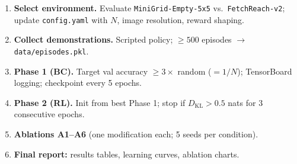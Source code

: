 \documentclass[11pt, a4paper]{article}
\begin{document}
\begin{enumerate}[leftmargin=1.5em, itemsep=0pt, topsep=1pt]
  \item \textbf{Select environment.}
        Evaluate \texttt{MiniGrid-Empty-5x5} vs.\ \texttt{FetchReach-v2};
        update \texttt{config.yaml} with $N$, image resolution, reward shaping.

  \item \textbf{Collect demonstrations.}
        Scripted policy; ${\geq}500$ episodes $\to$ \texttt{data/episodes.pkl}.

  \item \textbf{Phase 1 (BC).}
        Target val accuracy $\geq 3\times$ random ($= 1/N$);
        TensorBoard logging; checkpoint every 5 epochs.

  \item \textbf{Phase 2 (RL).}
        Init from best Phase 1; stop if $D_{\mathrm{KL}} > 0.5$ nats
        for 3 consecutive epochs.

  \item \textbf{Ablations A1--A6} (one modification each; 5 seeds per condition).

  \item \textbf{Final report:} results tables, learning curves, ablation charts.
\end{enumerate}
\end{document}
